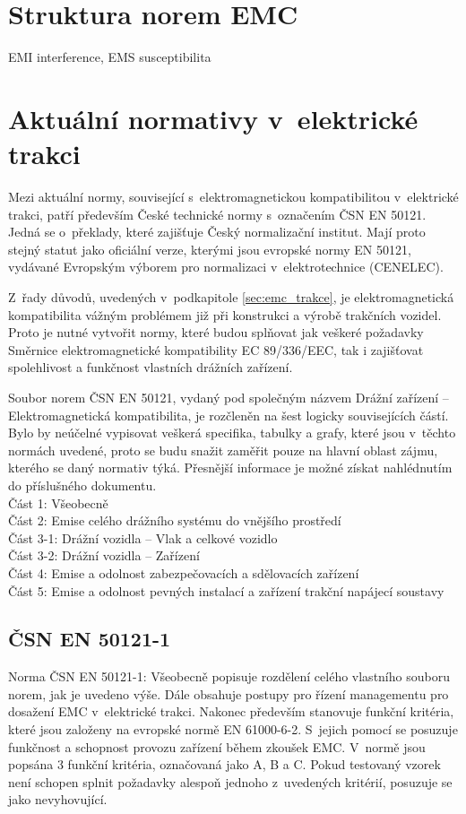 \section{Struktura norem EMC}
EMI interference, EMS susceptibilita
\newpage

\section{Aktuální normativy v~elektrické trakci} \label{sec:emc_normy_trakce}
Mezi aktuální normy, související s~elektromagnetickou kompatibilitou v~elektrické trakci, patří především České technické normy s~označením ČSN EN 50121. Jedná se o~překlady, které zajišťuje Český normalizační institut. Mají proto stejný statut jako oficiální verze, kterými jsou evropské normy EN 50121, vydávané Evropským výborem pro normalizaci v~elektrotechnice (CENELEC). 

 Z~řady důvodů, uvedených v~podkapitole \ref{sec:emc_trakce},  je elektromagnetická kompatibilita vážným problémem již při konstrukci a výrobě trakčních vozidel. Proto je nutné vytvořit normy, které budou splňovat jak veškeré požadavky Směrnice elektromagnetické kompatibility EC 89/336/EEC, tak i zajišťovat spolehlivost a funkčnost vlastních drážních zařízení.

Soubor norem ČSN EN 50121, vydaný pod společným názvem Drážní zařízení – Elektromagnetická kompatibilita, je rozčleněn na šest logicky souvisejících částí. Bylo by neúčelné vypisovat veškerá specifika, tabulky a grafy, které jsou v~těchto normách uvedené, proto se budu snažit zaměřit pouze na hlavní oblast zájmu, kterého se daný normativ týká. Přesnější informace je možné získat nahlédnutím do příslušného dokumentu. \bigskip \\
Část 1: Všeobecně\\
Část 2: Emise celého drážního  systému do vnějšího prostředí\\
Část 3-1: Drážní vozidla – Vlak a celkové vozidlo\\
Část 3-2: Drážní vozidla – Zařízení\\
Část 4: Emise a odolnost zabezpečovacích a sdělovacích zařízení\\
Část 5: Emise a odolnost pevných instalací a zařízení trakční napájecí soustavy\\

\subsection{ČSN EN 50121-1}
Norma ČSN EN 50121-1: Všeobecně popisuje rozdělení celého vlastního souboru norem, jak je uvedeno výše. Dále obsahuje postupy pro řízení managementu pro dosažení EMC v~elektrické trakci. Nakonec především stanovuje funkční kritéria, které jsou založeny na evropské normě EN 61000-6-2. S~jejich pomocí se posuzuje funkčnost a schopnost provozu zařízení během zkoušek EMC. V~normě jsou popsána 3 funkční kritéria, označovaná jako A, B a C. Pokud testovaný vzorek není schopen splnit požadavky alespoň jednoho z~uvedených kritérií, posuzuje se jako nevyhovující.

